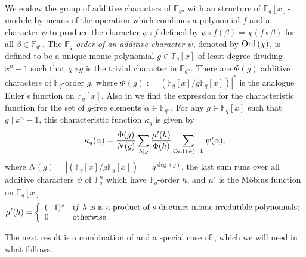 \documentclass[12pt]{article}
\newcommand{\F}{\mathbb{F}}
\def \Ord {\rm{Ord}\,}
\begin{document}
We endow the group of additive characters of 
$\mathbb{F}_{q^n}$ with an structure of  $\mathbb{F}_q[x]$-module by means of  
the 
operation which combines a polynomial $f$ and a character $\psi$ to produce the 
character $\psi \circ f$ defined by $\psi \circ f(\beta) = 
\chi(f \circ \beta)$ for all  $\beta \in \mathbb{F}_{q^n}$.
The \textit{$\mathbb{F}_q$-order of an additive character $\psi$}, denoted by 
$\Ord{(\chi)}$, is defined to be a 
unique monic polynomial $g \in \mathbb{F}_q [x]$ of least degree dividing 
$x^n-1$ such that $\chi \circ g$ is the trivial character in $\mathbb{F}_{q^n}$.
There are $\Phi(g)$ additive characters of 
$\mathbb{F}_q$-order $g$, where $\Phi(g):= |(\mathbb{F}_q[x] / g 
\mathbb{F}_q[x])|^{\ast}$ is the analogue Euler's function on 
$\mathbb{F}_q[x]$. 
Also in \cite[Section 3]{CH} we find the expression for the characteristic  
function 
for the set of $g$-free elements $\alpha \in \mathbb{F}_{q^n}$.
	For any $g \in \F_{q}[x]$ such that $g \mid x^n -1$,
	this characteristic function $\kappa_{g}$
	is given by 
	\begin{equation} \label{char-g-free}
	\kappa_g(\alpha) = \frac{\Phi(g)}{N(g)}
	\sum_{h \mid g} \frac{\mu'(h)}{\Phi(h)}
	\sum_{\Ord (\psi)=h} \psi(\alpha),
	\end{equation}
	where
	$N(g) = \left|   \left(  \F_{q}[x] / g\F_{q}[x] \right) 
	\right|=q^{\deg(g)}$,
	the last sum runs over all additive characters $\psi$ of $\mathbb{F}_q^n$ 
	which have   
	$\F_{q}$-order $h$, and $\mu'$ is the M\"obius function on $\F_{q}[x]$
$$
\mu'(h) =
\left\{
\begin{array}{ll}
(-1)^s & {\textrm if} \,\, h \mbox{ is is a product of } s \mbox{ disctinct 
monic 
irredutible polynomials;} \\
0 & \rm{ otherwise. }
\end{array}
\right.
$$

The next result is a combination of \cite[Theorem 5.5]{Fu} and a special case 
of \cite[Theorem 5.6]{Fu}, which we will need in what follows.
\end{document}
